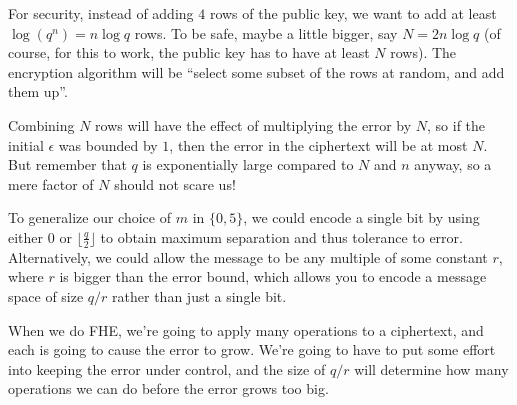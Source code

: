 For security, instead of adding $4$ rows of the public key, we want to
add at least $\log( q^{n} ) = n\log q$ rows. To be safe,
maybe a little bigger, say $N = 2n\log q$ (of course, for this to
work, the public key has to have at least $N$ rows). The encryption
algorithm will be ``select some subset of the rows at random, and add
them up''.

Combining $N$ rows will have the effect of multiplying the error by
$N$, so if the initial $\epsilon$ was bounded by $1$, then the
error in the ciphertext will be at most $N$. But remember that $q$
is exponentially large compared to $N$ and $n$ anyway, so a mere
factor of $N$ should not scare us!

To generalize our choice of $m$ in $\{ 0,5\}$, we could encode a
single bit by using either $0$ or $\lfloor\frac{q}{2}\rfloor$ to
obtain maximum separation and thus tolerance to error. Alternatively, we
could allow the message to be any multiple of some constant $r$, where
$r$ is bigger than the error bound, which
allows you to encode a message space of size $q/r$ rather than just a
single bit.

When we do FHE, we're going to apply many operations to a ciphertext,
and each is going to cause the error to grow. We're going to have to
put some effort into keeping the error under control, and the size of
$q/r$ will determine how many operations we can do before the error
grows too big.
